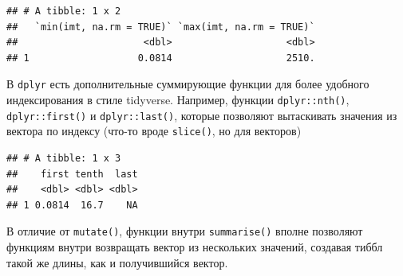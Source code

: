 \documentclass[
]{book}
\newenvironment{Shaded}{\begin{snugshade}}{\end{snugshade}}
\newcommand{\CommentTok}[1]{\textcolor[rgb]{0.56,0.35,0.01}{\textit{#1}}}
\newcommand{\DataTypeTok}[1]{\textcolor[rgb]{0.13,0.29,0.53}{#1}}
\newcommand{\DecValTok}[1]{\textcolor[rgb]{0.00,0.00,0.81}{#1}}
\newcommand{\KeywordTok}[1]{\textcolor[rgb]{0.13,0.29,0.53}{\textbf{#1}}}
\newcommand{\NormalTok}[1]{#1}
\newcommand{\OperatorTok}[1]{\textcolor[rgb]{0.81,0.36,0.00}{\textbf{#1}}}
\newcommand{\OtherTok}[1]{\textcolor[rgb]{0.56,0.35,0.01}{#1}}
\newcommand{\StringTok}[1]{\textcolor[rgb]{0.31,0.60,0.02}{#1}}
\begin{document}
\begin{verbatim}
## # A tibble: 1 x 2
##   `min(imt, na.rm = TRUE)` `max(imt, na.rm = TRUE)`
##                      <dbl>                    <dbl>
## 1                   0.0814                    2510.
\end{verbatim}

В \texttt{dplyr} есть дополнительные суммирующие функции для более удобного индексирования в стиле tidyverse. Например, функции \texttt{dplyr::nth()}, \texttt{dplyr::first()} и \texttt{dplyr::last()}, которые позволяют вытаскивать значения из вектора по индексу (что-то вроде \texttt{slice()}, но для векторов)

\begin{Shaded}
\end{Shaded}

\begin{verbatim}
## # A tibble: 1 x 3
##    first tenth  last
##    <dbl> <dbl> <dbl>
## 1 0.0814  16.7    NA
\end{verbatim}

В отличие от \texttt{mutate()}, функции внутри \texttt{summarise()} вполне позволяют функциям внутри возвращать вектор из нескольких значений, создавая тиббл такой же длины, как и получившийся вектор.

\begin{Shaded}
\end{Shaded}
\end{document}
